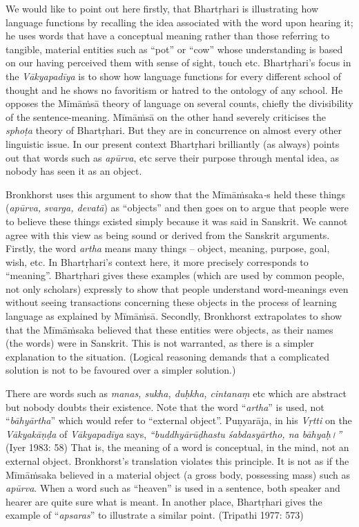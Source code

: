 We would like to point out here firstly, that Bhartṛhari is illustrating how language functions by recalling the idea associated with the word upon hearing it; he uses words that have a conceptual meaning rather than those referring to tangible, material entities such as “pot” or “cow” whose understanding is based on our having perceived them with sense of sight, touch etc. Bhartṛhari’s focus in the \textit{Vākyapadīya} is to show how language functions for every different school of thought and he shows no favoritism or hatred to the ontology of any school. He opposes the Mīmāṁsā theory of language on several counts, chiefly the divisibility of the sentence-meaning. Mīmāṁsā on the other hand severely criticises the \textit{sphoṭa} theory of Bhartṛhari. But they are in concurrence on almost every other linguistic issue. In our present context Bhartṛhari brilliantly (as always) points out that words such as \textit{apūrva}, etc serve their purpose through mental idea, as nobody has seen it as an object.

Bronkhorst uses this argument to show that the Mīmāṁsaka\textit{-}s held these things (\textit{apūrva, svarga, devatā}) as “objects” and then goes on to argue that people were to believe these things existed simply because it was said in Sanskrit. We cannot agree with this view as being sound or derived from the Sanskrit arguments. Firstly, the word \textit{artha} means many things -- object, meaning, purpose, goal, wish, etc. In Bhartṛhari’s context here, it more precisely corresponds to “meaning”. Bhartṛhari gives these examples (which are used by common people, not only scholars) expressly to show that people understand word-meanings even without seeing transactions concerning these objects in the process of learning language as explained by Mīmāṁsā. Secondly, Bronkhorst extrapolates to show that the Mīmāṁsaka believed that these entities were objects, as their names (the words) were in Sanskrit. This is not warranted, as there is a simpler explanation to the situation. (Logical reasoning demands that a complicated solution is not to be favoured over a simpler solution.)

There are words such as \textit{manas, sukha, duḥkha, cintanaṃ} etc which are abstract but nobody doubts their existence. Note that the word “\textit{artha}” is used, not “\textit{bāhyārtha}” which would refer to “external object”. Puṇyarāja, in his \textit{Vṛtti} on the \textit{Vākyakāṇḍa} of \textit{Vākyapadīya} says, \textit{“buddhyārūḍhastu śabdasyārtho, na bāhyaḥ।”} (Iyer 1983: 58) That is, the meaning of a word is conceptual, in the mind, not an external object. Bronkhorst’s translation violates this principle. It is not as if the Mīmāṁsaka believed in a material object (a gross body, possessing mass) such as \textit{apūrva}. When a word such as “heaven” is used in a sentence, both speaker and hearer are quite sure what is meant. In another place, Bhartṛhari gives the example of “\textit{apsaras}” to illustrate a similar point. (Tripathi 1977: 573)

